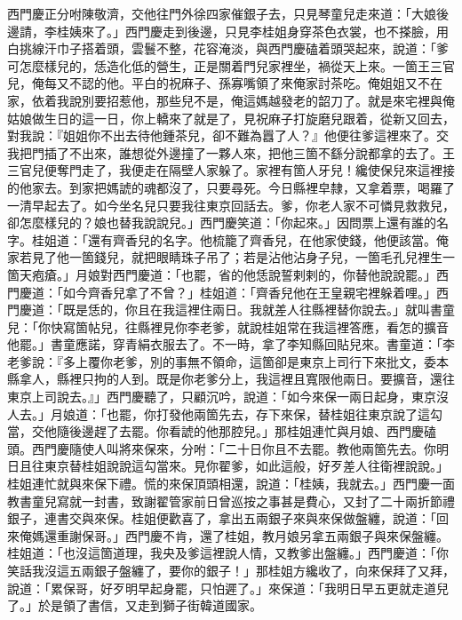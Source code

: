 西門慶正分咐陳敬濟，交他往門外徐四家催銀子去，只見琴童兒走來道：「大娘後邊請，李桂姨來了。」西門慶走到後邊，只見李桂姐身穿茶色衣裳，也不搽臉，用白挑線汗巾子搭着頭，雲鬟不整，花容淹淡，與西門慶磕着頭哭起來，說道：「爹可怎麼樣兒的，恁造化低的營生，正是關着門兒家裡坐，禍從天上來。一箇王三官兒，俺每又不認的他。平白的祝麻子、孫寡嘴領了來俺家討茶吃。俺姐姐又不在家，依着我說別要招惹他，那些兒不是，{}俺這媽越發老的韶刀了。就是來宅裡與俺姑娘做生日的這一日，你上轎來了就是了，見祝麻子打旋磨兒跟着，從新又回去，對我說：『姐姐你不出去待他鍾茶兒，卻不難為囂了人？』他便往爹這裡來了。交我把門插了不出來，誰想從外邊撞了一夥人來，把他三箇不繇分說都拿的去了。王三官兒便奪門走了，我便走在隔壁人家躲了。家裡有箇人牙兒！纔使保兒來這裡接的他家去。到家把媽諕的魂都沒了，只要尋死。今日縣裡皁隸，又拿着票，喝羅了一清早起去了。如今坐名兒只要我往東京回話去。爹，你老人家不可憐見救救兒，卻怎麼樣兒的？娘也替我說說兒。」{}西門慶笑道：「你起來。」因問票上還有誰的名字。桂姐道：「還有齊香兒的名字。他梳籠了齊香兒，在他家使錢，他便該當。{}俺家若見了他一箇錢兒，就把眼睛珠子吊了；若是沾他沾身子兒，一箇毛孔兒裡生一箇天疱瘡。」月娘對西門慶道：「也罷，省的他恁說誓剌剌的，你替他說說罷。」西門慶道：「如今齊香兒拿了不曾？」桂姐道：「齊香兒他在王皇親宅裡躲着哩。」西門慶道：「既是恁的，你且在我這裡住兩日。我就差人往縣裡替你說去。」就叫書童兒：「你快寫箇帖兒，往縣裡見你李老爹，就說桂姐常在我這裡答應，看怎的擴音他罷。」書童應諾，穿青絹衣服去了。不一時，拿了李知縣回貼兒來。書童道：「李老爹說：『多上覆你老爹，別的事無不領命，這箇卻是東京上司行下來批文，委本縣拿人，縣裡只拘的人到。既是你老爹分上，我這裡且寬限他兩日。要擴音，還往東京上司說去。』」西門慶聽了，只顧沉吟，說道：「如今來保一兩日起身，東京沒人去。」月娘道：「也罷，你打發他兩箇先去，存下來保，替桂姐往東京說了這勾當，交他隨後邊趕了去罷。你看諕的他那腔兒。」那桂姐連忙與月娘、西門慶磕頭。{}西門慶隨使人叫將來保來，分咐：「二十日你且不去罷。教他兩箇先去。你明日且往東京替桂姐說說這勾當來。見你翟爹，如此這般，好歹差人往衛裡說說。」桂姐連忙就與來保下禮。慌的來保頂頭相還，說道：「桂姨，我就去。」{}西門慶一面教書童兒寫就一封書，致謝翟管家前日曾巡按之事甚是費心，又封了二十兩折節禮銀子，連書交與來保。桂姐便歡喜了，拿出五兩銀子來與來保做盤纏，說道：「回來俺媽還重謝保哥。」西門慶不肯，還了桂姐，教月娘另拿五兩銀子與來保盤纏。桂姐道：「也沒這箇道理，我央及爹這裡說人情，又教爹出盤纏。」西門慶道：「你笑話我沒這五兩銀子盤纏了，要你的銀子！」{}那桂姐方纔收了，向來保拜了又拜，說道：「累保哥，好歹明早起身罷，只怕遲了。」來保道：「我明日早五更就走道兒了。」於是領了書信，又走到獅子街韓道國家。

